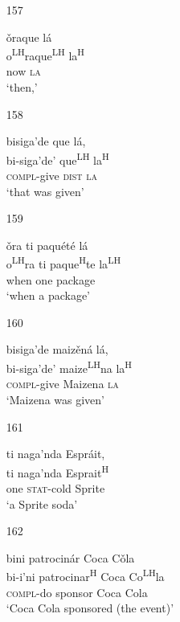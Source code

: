 \begin{itemize}
\item[157]
 
\glll   \v{o}raque l\'{a} \\
o\textsuperscript{LH}raque\textsuperscript{LH}  la\textsuperscript{H} \\
now \textsc{la}\\
\glt `then,'
 


\item[158]
 
\glll  bisiga'de que l\'{a},\\
bi-siga'de' que\textsuperscript{LH} la\textsuperscript{H}\\
\textsc{compl}-give \textsc{dist} \textsc{la}\\
\glt `that was given'
 


\item[159]
 
\glll   \v{o}ra ti paqu\'{e}t\'{e} l\'{a}\\
o\textsuperscript{LH}ra ti paque\textsuperscript{H}te la\textsuperscript{LH} \\
when one package\\
\glt `when a package'
 


\item[160]
 
\glll   bisiga'de maiz\v{e}n\'{a} l\'{a}, \\
 bi-siga'de' maize\textsuperscript{LH}na la\textsuperscript{H}\\
\textsc{compl}-give Maizena \textsc{la}\\
\glt `Maizena was given'
 


\item[161]
 
\glll  ti naga'nda Espr\'{a}it, \\
ti naga'nda Esprait\textsuperscript{H}\\
one \textsc{stat}-cold Sprite\\
\glt `a Sprite soda'
 


\item[162]
 
\glll  bini patrocin\'{a}r Coca C\v{o}la\\
bi-i'ni patrocinar\textsuperscript{H} Coca Co\textsuperscript{LH}la\\
\textsc{compl}-do sponsor Coca Cola\\
\glt `Coca Cola sponsored (the event)'
 



\end{itemize}
